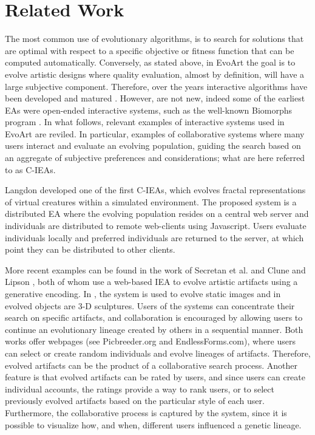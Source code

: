 \documentclass{sig-alternate}
\begin{document}
\section{Related Work}
\label{sec:related}
The most common use of evolutionary algorithms, is to search for solutions that are optimal with respect to a specific objective or fitness function that
can be computed automatically.
Conversely, as stated above, in EvoArt the goal is to evolve artistic designs where quality evaluation, almost by definition, will have a large subjective component.
Therefore, over the years interactive algorithms have been developed and matured \cite{ie1,ie2}.
However, are not new, indeed some of the earliest EAs were open-ended interactive systems, such as the well-known Biomorphs program \cite{biomorphs}.
In what follows, relevant examples of interactive systems used in EvoArt are reviled.
In particular, examples of collaborative systems where many users interact and evaluate an evolving population, guiding the search based on an aggregate of subjective preferences and considerations; what are here referred to as C-IEAs.

Langdon \cite{langdon:2004} developed one of the first C-IEAs, which evolves fractal representations of virtual creatures within a simulated environment.
The proposed system is a distributed EA where the evolving population resides on a central web server and individuals are distributed
to remote web-clients using Javascript.
Users evaluate individuals locally and preferred individuals are returned to the server, at which point they can be distributed to other clients.

More recent examples can be found in the work of Secretan et al. \cite{picbreeder} and Clune and Lipson \cite{forms}, both of whom use a web-based IEA to evolve artistic artifacts
using a generative encoding.
In \cite{picbreeder}, the system is used to evolve static images and in \cite{forms} evolved objects are 3-D sculptures.
Users of the systems can concentrate their search on specific artifacts, and collaboration is encouraged by allowing users to continue an evolutionary lineage created by others
in a sequential manner.
Both works offer webpages (see Picbreeder.org and EndlessForms.com),
where users can select or create random individuals and evolve lineages of artifacts.
Therefore, evolved artifacts can be the product of a collaborative search process.
Another feature is that evolved artifacts can be rated by users, and since users can create individual accounts, the ratings provide a way to rank users,
or to select previously evolved artifacts based on the particular style of each user.
Furthermore, the collaborative process is captured by the system, since it is possible to visualize how, and when, different users influenced
a genetic lineage.
\end{document}
